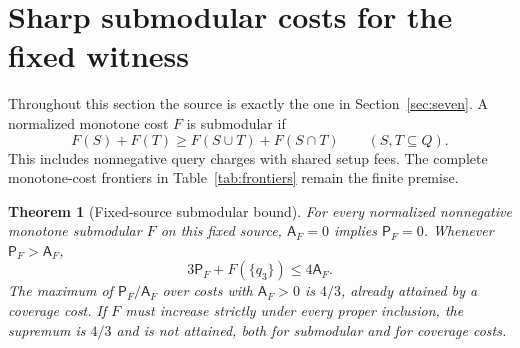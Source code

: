 \documentclass[pdflatex,sn-mathphys-num]{sn-jnl}
\newcommand{\A}{\mathsf{A}}
\newcommand{\Pcost}{\mathsf{P}}
\theoremstyle{thmstyleone}
\newtheorem{theorem}{Theorem}
\theoremstyle{thmstylethree}
\theoremstyle{thmstyletwo}
\begin{document}
\section{Sharp submodular costs for the fixed witness}\label{sec:submodular}
Throughout this section the source is exactly the one in Section~\ref{sec:seven}. A normalized monotone cost $F$ is submodular if
\[
 F(S)+F(T)\geq F(S\cup T)+F(S\cap T)\qquad(S,T\subseteq Q).
\]
This includes nonnegative query charges with shared setup fees. The complete monotone-cost frontiers in Table~\ref{tab:frontiers} remain the finite premise.

\begin{theorem}[Fixed-source submodular bound]\label{thm:submodular}
For every normalized nonnegative monotone submodular $F$ on this fixed source, $\A_F=0$ implies $\Pcost_F=0$. Whenever $\Pcost_F>\A_F$,
\begin{equation}\label{eq:strengthened}
 3\Pcost_F+F(\{q_3\})\leq4\A_F.
\end{equation}
The maximum of $\Pcost_F/\A_F$ over costs with $\A_F>0$ is $4/3$, already attained by a coverage cost. If $F$ must increase strictly under every proper inclusion, the supremum is $4/3$ and is not attained, both for submodular and for coverage costs.
\end{theorem}
\end{document}
